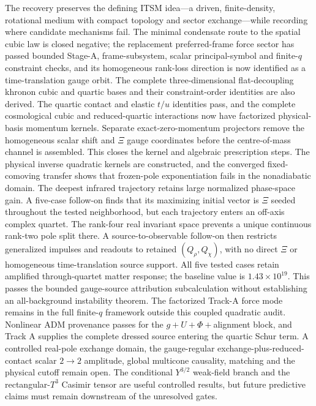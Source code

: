 ﻿\documentclass[11pt]{article}
\newcommand{\Tthree}{T^3}
\begin{document}
The recovery preserves the defining ITSM idea---a driven, finite-density,
rotational medium with compact topology and sector exchange---while recording
where candidate mechanisms fail.  The minimal condensate route to the spatial
cubic law is closed negative; the replacement preferred-frame force sector has
passed bounded Stage-A, frame-subsystem, scalar principal-symbol and finite-$q$
constraint checks, and its homogeneous rank-loss direction is now identified
as a time-translation gauge orbit.  The complete three-dimensional
flat-decoupling khronon cubic and quartic bases and their constraint-order
identities are also derived.  The quartic contact and elastic $t/u$ identities
pass, and the complete cosmological cubic and reduced-quartic interactions
now have factorized
physical-basis momentum kernels.  Separate exact-zero-momentum projectors
remove the homogeneous scalar shift and $\Xi$ gauge coordinates before the
centre-of-mass channel is assembled.  This closes the kernel and algebraic
prescription steps.  The physical inverse quadratic kernels are constructed,
and the converged fixed-comoving transfer shows that frozen-pole exponentiation
fails in the nonadiabatic domain.  The deepest infrared trajectory retains
large normalized phase-space gain.  A five-case follow-on finds that its
maximizing initial vector is $\Xi$ seeded throughout the tested neighborhood,
but each trajectory enters an off-axis complex quartet.  The rank-four real
invariant space prevents a unique continuous rank-two pole split there.  A
source-to-observable follow-on then restricts generalized impulses and
readouts to retained $(Q_\rho,Q_\chi)$, with no direct $\Xi$ or homogeneous
time-translation source support.  All five tested cases retain amplified
through-quartet matter response; the baseline value is
$1.43\times10^{19}$.  This passes the bounded gauge-source attribution
subcalculation without establishing an all-background instability theorem.
The factorized Track-A force mode remains in the full finite-$q$ framework
outside this coupled quadratic audit.  Nonlinear ADM provenance passes for
the $g+U+\Phi+$alignment block, and Track A supplies the complete dressed
source entering the quartic Schur term.  A controlled real-pole exchange
domain, the gauge-regular exchange-plus-reduced-contact scalar $2\to2$
amplitude, global multicone
causality, matching and the physical cutoff remain open.  The conditional
$Y^{3/2}$ weak-field branch and
the rectangular-$\Tthree$ Casimir tensor are useful controlled results, but
future predictive claims must remain downstream of the unresolved gates.


\end{document}
